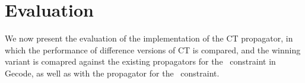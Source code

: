 \documentclass[a4paper,11pt]{article}
\newcommand{\Secref}[1]{Section~\ref{#1}}
\newcommand{\Table}{\Constraint{Table}}
\newcommand{\Supports}{\texttt{supports}}
\newcommand{\Residues}{\texttt{residues}}
\numberwithin{equation}{section}
\begin{document}











\section{Evaluation}
\label{evaluation}

We now present the evaluation of the implementation of the CT propagator,
in which the performance of difference versions of CT is compared,
and the winning variant is comapred against the existing propagators for
the \Table~constraint in Gecode, as well as with the propagator for the
~constraint.
\end{document}
